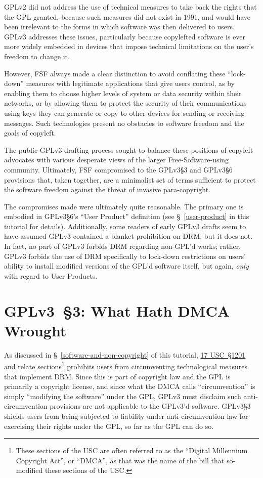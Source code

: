 GPLv2 did not address the use of technical measures to take back the rights
that the GPL granted, because such measures did not exist in 1991, and would
have been irrelevant to the forms in which software was then delivered to
users.  GPLv3 addresses these issues, particularly because copylefted
software is ever more widely embedded in devices that impose technical
limitations on the user's freedom to change it.

However, FSF always made a clear distinction to avoid conflating these
``lock-down'' measures with legitimate applications that give users control,
as by enabling them to choose higher levels of system or data security within
their networks, or by allowing them to protect the security of their
communications using keys they can generate or copy to other devices for
sending or receiving messages.  Such technologies present no obstacles to
software freedom and the goals of copyleft.

The public GPLv3 drafting process sought to balance these positions of
copyleft advocates with various desperate views of the larger
Free-Software-using community.  Ultimately, FSF compromised to the GPLv3\S3
and GPLv3\S6 provisions that, taken together, are a minimalist set of terms
sufficient to protect the software freedom against the threat of invasive
para-copyright.

The compromises made were ultimately quite reasonable.  The primary one is
embodied in GPLv3\S6's ``User Product'' definition (see \S~\ref{user-product}
in this tutorial for details).  Additionally, some readers of early GPLv3
drafts seem to have assumed GPLv3 contained a blanket prohibition on DRM; but
it does not.  In fact, no part of GPLv3 forbids DRM regarding non-GPL'd
works; rather, GPLv3 forbids the use of DRM specifically to lock-down
restrictions on users' ability to install modified versions of the GPL'd
software itself, but again, \textit{only} with regard to User Products.

\section{GPLv3~\S3: What Hath DMCA Wrought}
\label{GPLv3s3}

As discussed in \S~\ref{software-and-non-copyright} of this tutorial,
\href{http://www.law.cornell.edu/uscode/text/17/1201}{17 USC~\S1201} and
relate sections\footnote{These sections of the USC are often referred to as
  the ``Digital Millennium Copyright Act'', or ``DMCA'', as that was the name
  of the bill that so-modified these sections of the USC\@.} prohibits users
from circumventing technological measures that implement DRM\@.  Since this
is part of copyright law and the GPL is primarily a copyright license, and
since what the DMCA calls ``circumvention'' is simply ``modifying the
software'' under the GPL, GPLv3 must disclaim such anti-circumvention
provisions are not applicable to the GPLv3'd software.  GPLv3\S3 shields
users from being subjected to liability under anti-circumvention law for
exercising their rights under the GPL, so far as the GPL can do so.

